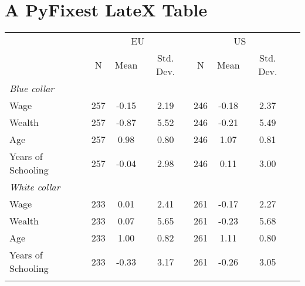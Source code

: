 \documentclass{article}%
\begin{document}
%
\normalsize%
\section{A PyFixest LateX Table}%
\label{sec:APyFixestLateXTable}%


\begin{table}[htbp]%
\renewcommand\cellalign{t}
\begin{threeparttable}
\begin{tabular}{lccccccc}
\toprule
 & \multicolumn{3}{c}{EU} & \multicolumn{3}{c}{US} \\
\cmidrule(lr){2-4} \cmidrule(lr){5-7} 
 & N & Mean & Std. Dev. & N & Mean & Std. Dev. \\
\midrule
\addlinespace
\emph{Blue collar} \\
\addlinespace
Wage & 257 & -0.15 & 2.19 & 246 & -0.18 & 2.37 \\
Wealth & 257 & -0.87 & 5.52 & 246 & -0.21 & 5.49 \\
Age & 257 & 0.98 & 0.80 & 246 & 1.07 & 0.81 \\
Years of Schooling & 257 & -0.04 & 2.98 & 246 & 0.11 & 3.00 \\
\addlinespace
\midrule
\addlinespace
\emph{White collar} \\
\addlinespace
Wage & 233 & 0.01 & 2.41 & 261 & -0.17 & 2.27 \\
Wealth & 233 & 0.07 & 5.65 & 261 & -0.23 & 5.68 \\
Age & 233 & 1.00 & 0.82 & 261 & 1.11 & 0.80 \\
Years of Schooling & 233 & -0.33 & 3.17 & 261 & -0.26 & 3.05 \\
\addlinespace
\bottomrule
\end{tabular}
\footnotesize 
\end{threeparttable}%
\end{table}

%
\end{document}
